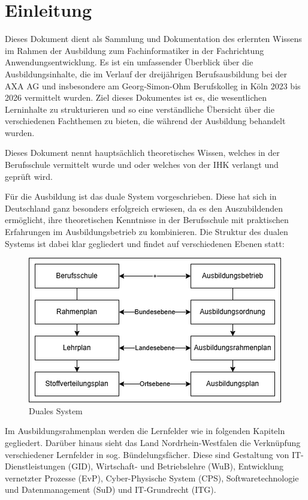 \section{Einleitung}
Dieses Dokument dient als Sammlung und Dokumentation des erlernten Wissens im Rahmen der Ausbildung zum Fachinformatiker in der Fachrichtung Anwendungsentwicklung. Es ist ein umfassender Überblick über die Ausbildungsinhalte, die im Verlauf der dreijährigen Berufsausbildung bei der AXA AG und insbesondere am Georg-Simon-Ohm Berufskolleg in Köln 2023 bis 2026 vermittelt wurden. Ziel dieses Dokumentes ist es, die wesentlichen Lerninhalte zu strukturieren und so eine verständliche Übersicht über die verschiedenen Fachthemen zu bieten, die während der Ausbildung behandelt wurden.

Dieses Dokument nennt hauptsächlich theoretisches Wissen, welches in der Berufsschule vermittelt wurde und oder welches von der IHK verlangt und geprüft wird.

Für die Ausbildung ist das duale System vorgeschrieben. Diese hat sich in Deutschland ganz besonders erfolgreich erwiesen, da es den Auszubildenden ermöglicht, ihre theoretischen Kenntnisse in der Berufsschule mit praktischen Erfahrungen im Ausbildungsbetrieb zu kombinieren. Die Struktur des dualen Systems ist dabei klar gegliedert und findet auf verschiedenen Ebenen statt:

\begin{figure}[H]
    \centering
    \includegraphics[width=\textwidth]{figures/dualesSystem.png}
    \caption{Duales System}
    \label{fig:dualesSystem}
\end{figure}
\FloatBarrier

Im Ausbildungsrahmenplan werden die Lernfelder wie in folgenden Kapiteln gegliedert. Darüber hinaus sieht das Land Nordrhein-Westfalen die Verknüpfung verschiedener Lernfelder in sog. Bündelungsfächer. Diese sind Gestaltung von IT-Dienstleistungen (GID), Wirtschaft- und Betriebslehre (WuB), Entwicklung vernetzter Prozesse (EvP), Cyber-Physische System (CPS), Softwaretechnologie und Datenmanagement (SuD) und IT-Grundrecht (ITG).

